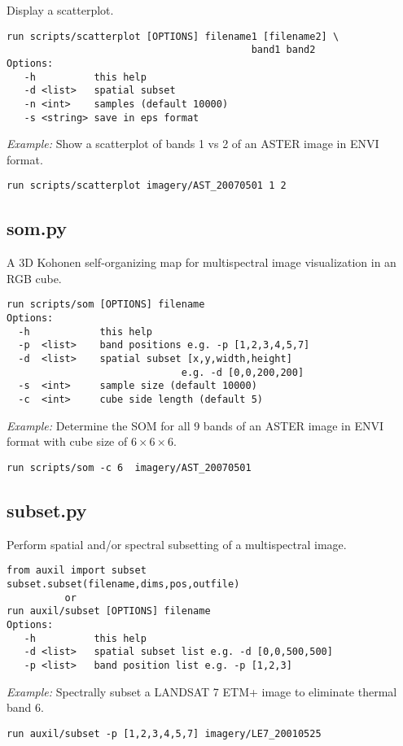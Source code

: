 \documentclass{paper}
\begin{document}
Display a scatterplot.
\begin{verbatim}
run scripts/scatterplot [OPTIONS] filename1 [filename2] \
                                          band1 band2
Options:
   -h          this help
   -d <list>   spatial subset
   -n <int>    samples (default 10000)
   -s <string> save in eps format
\end{verbatim}
{\it Example:} Show a scatterplot of bands 1 vs 2 of an ASTER image in ENVI format.
\begin{lstlisting}
run scripts/scatterplot imagery/AST_20070501 1 2
\end{lstlisting}





\subsection*{som.py}
A 3D Kohonen self-organizing map for multispectral image visualization in an RGB cube.
\begin{verbatim}
run scripts/som [OPTIONS] filename
Options:
  -h            this help
  -p  <list>    band positions e.g. -p [1,2,3,4,5,7]
  -d  <list>    spatial subset [x,y,width,height]
                              e.g. -d [0,0,200,200]
  -s  <int>     sample size (default 10000)
  -c  <int>     cube side length (default 5)
\end{verbatim}
{\it Example:} Determine the SOM for all 9 bands of an ASTER image in ENVI format with cube size of $6\times 6\times 6$.
\begin{lstlisting}
run scripts/som -c 6  imagery/AST_20070501
\end{lstlisting}


\subsection*{subset.py}
Perform spatial and/or spectral subsetting of a multispectral image.
\begin{verbatim}
from auxil import subset
subset.subset(filename,dims,pos,outfile)
          or
run auxil/subset [OPTIONS] filename
Options:
   -h          this help
   -d <list>   spatial subset list e.g. -d [0,0,500,500]
   -p <list>   band position list e.g. -p [1,2,3]
\end{verbatim}
{\it Example:} Spectrally subset a LANDSAT 7 ETM+ image to eliminate thermal band 6.
\begin{lstlisting}
run auxil/subset -p [1,2,3,4,5,7] imagery/LE7_20010525
\end{lstlisting}
\end{document}
